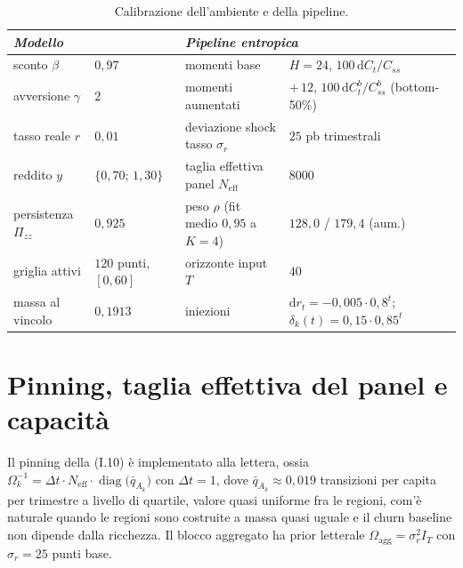 \documentclass[11pt,a4paper]{article}
\newcommand{\diag}{\operatorname{diag}}
\newcommand{\Neff}{N_{\mathrm{eff}}}
\newcommand{\dd}{\mathrm{d}}
\begin{document}
\begin{table}[t]
\centering\small
\caption{Calibrazione dell'ambiente e della pipeline.}
\label{tab:calibrazione}
\begin{tabular}{llll}
\toprule
\multicolumn{2}{l}{\emph{Modello}} & \multicolumn{2}{l}{\emph{Pipeline entropica}}\\
\midrule
sconto $\beta$ & $0{,}97$ & momenti base & $H=24$, $100\,\dd C_t/C_{ss}$\\
avversione $\gamma$ & $2$ & momenti aumentati & $+\,12$, $100\,\dd C^{b}_t/C^{b}_{ss}$ (bottom-50\%)\\
tasso reale $r$ & $0{,}01$ & deviazione shock tasso $\sigma_r$ & $25$ pb trimestrali\\
reddito $y$ & $\{0{,}70;\,1{,}30\}$ & taglia effettiva panel $\Neff$ & $8000$\\
persistenza $\Pi_{zz}$ & $0{,}925$ & peso $\rho$ (fit medio $0{,}95$ a $K{=}4$) & $128{,}0$ / $179{,}4$ (aum.)\\
griglia attivi & $120$ punti, $[0,60]$ & orizzonte input $T$ & $40$\\
massa al vincolo & $0{,}1913$ & iniezioni & $\dd r_t=-0{,}005\cdot0{,}8^t$;\ \ $\delta_k(t)=0{,}15\cdot0{,}85^t$\\
\bottomrule
\end{tabular}
\end{table}

\section{Pinning, taglia effettiva del panel e capacit\`a}\label{sec:neff}
Il pinning della (I.10) \`e implementato alla lettera, ossia $\Omega_k^{-1}=\Delta t\cdot\Neff\cdot\diag\bigl(\bar q_{A_k}\bigr)$ con $\Delta t=1$, dove $\bar q_{A_k}\approx0{,}019$ transizioni per capita per trimestre a livello di quartile, valore quasi uniforme fra le regioni, com'\`e naturale quando le regioni sono costruite a massa quasi uguale e il churn baseline non dipende dalla ricchezza. Il blocco aggregato ha prior letterale $\Omega_{\mathrm{agg}}=\sigma_r^2 I_T$ con $\sigma_r=25$ punti base.
\end{document}
